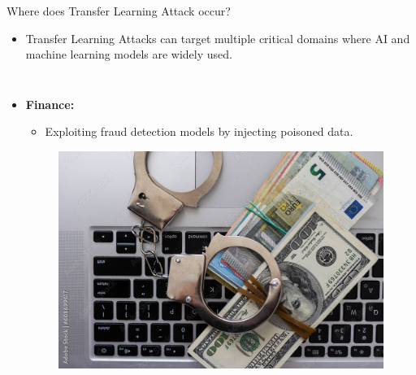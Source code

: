 \begin{frame}{Where does Transfer Learning Attack occur?}
    \begin{itemize}
        \item Transfer Learning Attacks can target multiple critical domains where AI and machine learning models are widely used.
    \end{itemize}

    \begin{columns}
        \begin{itemize}
            \item \textbf{\large Finance:}
            \begin{itemize}
                \item Exploiting fraud detection models by injecting poisoned data.
            \end{itemize}
            \begin{figure}[h]
                \centering
                \includegraphics[width=0.7\linewidth]{img/Approving_illegitimate_transactions.png}
            \end{figure}
        \end{itemize}


\end{columns}
\end{frame}
